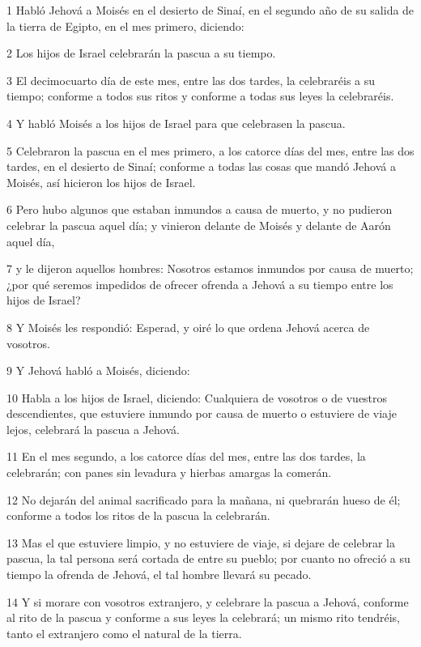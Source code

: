 \par 1 Habló Jehová a Moisés en el desierto de Sinaí, en el segundo año de su salida de la tierra de Egipto, en el mes primero, diciendo:
\par 2 Los hijos de Israel celebrarán la pascua a su tiempo.
\par 3 El decimocuarto día de este mes, entre las dos tardes, la celebraréis a su tiempo; conforme a todos sus ritos y conforme a todas sus leyes la celebraréis.
\par 4 Y habló Moisés a los hijos de Israel para que celebrasen la pascua.
\par 5 Celebraron la pascua en el mes primero, a los catorce días del mes, entre las dos tardes, en el desierto de Sinaí; conforme a todas las cosas que mandó Jehová a Moisés, así hicieron los hijos de Israel.
\par 6 Pero hubo algunos que estaban inmundos a causa de muerto, y no pudieron celebrar la pascua aquel día; y vinieron delante de Moisés y delante de Aarón aquel día, 
\par 7 y le dijeron aquellos hombres: Nosotros estamos inmundos por causa de muerto; ¿por qué seremos impedidos de ofrecer ofrenda a Jehová a su tiempo entre los hijos de Israel?
\par 8 Y Moisés les respondió: Esperad, y oiré lo que ordena Jehová acerca de vosotros.
\par 9 Y Jehová habló a Moisés, diciendo:
\par 10 Habla a los hijos de Israel, diciendo: Cualquiera de vosotros o de vuestros descendientes, que estuviere inmundo por causa de muerto o estuviere de viaje lejos, celebrará la pascua a Jehová.
\par 11 En el mes segundo, a los catorce días del mes, entre las dos tardes, la celebrarán; con panes sin levadura y hierbas amargas la comerán.
\par 12 No dejarán del animal sacrificado para la mañana, ni quebrarán hueso de él; conforme a todos los ritos de la pascua la celebrarán.
\par 13 Mas el que estuviere limpio, y no estuviere de viaje, si dejare de celebrar la pascua, la tal persona será cortada de entre su pueblo; por cuanto no ofreció a su tiempo la ofrenda de Jehová, el tal hombre llevará su pecado.
\par 14 Y si morare con vosotros extranjero, y celebrare la pascua a Jehová, conforme al rito de la pascua y conforme a sus leyes la celebrará; un mismo rito tendréis, tanto el extranjero como el natural de la tierra.

